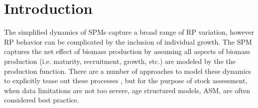 %
\newcommand{\kr}{ \frac{\kappa w_\infty}{w(a_s)} }
\newcommand{\one}{
        \left(\frac{Z(Z+\kappa)}{\alpha w(a_s)(Z+\kr)}\right)^\gamma
}
\newcommand{\two}{
        \left(\frac{\gamma F}{\alpha w(a_s)}\right) \left(\frac{Z(Z+\kappa)}{\alpha w(a_s)(Z+\kr)}\right)^{\gamma-1}
}
\newcommand{\thr}{
        \frac{\left(\kr\right)\left(\kappa-\kr\right)}{(Z+\kr)^2}
}
%
\newcommand{\oneA}{
        \left(\frac{Z^*(Z^*+\kappa)}{w(a_s)(Z^*+\kr)}\right)^\gamma
}
\newcommand{\twoA}{
        \left(\frac{\gamma F^*}{w(a_s)}\right) \left(\frac{Z^*(Z^*+\kappa)}{w(a_s)(Z^*+\kr)}\right)^{\gamma-1}
}
\newcommand{\thrA}{
        \frac{\left(\kr\right)\left(\kappa-\kr\right)}{(Z^*+\kr)^2}
}




%
\section{\color{red}Introduction}

%
The simplified dynamics of SPMs capture a broad range of RP variation, however
RP behavior can be complicated by the inclusion of individual growth. %
The SPM captures the net effect of biomass production by assuming all aspects 
of biomass production (i.e. maturity, recruitment, growth, etc.) are modeled by the %
the production function. There are a number of %
approaches to model these dynamics to explicitly tease out these processes \cite{quinn_quantitative_1999, hilborn_quantitative_1992}, 
but for the purpose of stock assessment, when data limitations are not too severe, %
age structured models, ASM, \cite{methot_stock_2013} are often considered best practice.

